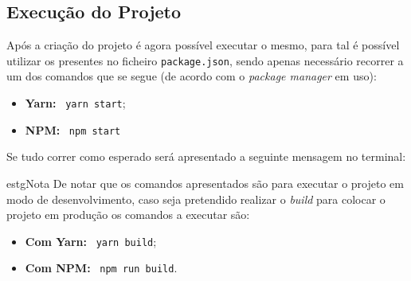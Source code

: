 \subsection{Execução do Projeto}

Após a criação do projeto é agora possível executar o mesmo, para tal é possível utilizar os \textit{} presentes no ficheiro \texttt{package.json}, sendo apenas necessário recorrer a um dos comandos que se segue (de acordo com o \textit{package manager} em uso):

\begin{itemize}
	\item \textbf{Yarn:} ~\texttt{yarn start};
	\item \textbf{NPM:} ~\texttt{npm start}
\end{itemize}

Se tudo correr como esperado será apresentado a seguinte mensagem no terminal:


\begin{mybox}{estg}{Nota}
	De notar que os comandos apresentados são para executar o projeto em modo de desenvolvimento, caso seja pretendido realizar o \textit{build} para colocar o projeto em produção os comandos a executar são:

	\begin{itemize}
		\item \textbf{Com Yarn:} ~\texttt{yarn build};
		\item \textbf{Com NPM:} ~\texttt{npm run build}.
	\end{itemize}
\end{mybox}